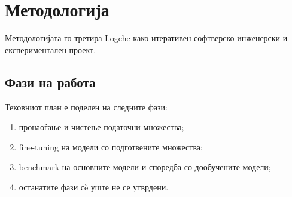 \chapter{Методологија}

Методологијата го третира Logche како итеративен софтверско-инженерски и експериментален проект.

\section{Фази на работа}

Тековниот план е поделен на следните фази:

\begin{enumerate}
  \item пронаоѓање и чистење податочни множества;
  \item fine-tuning на модели со подготвените множества;
  \item benchmark на основните модели и споредба со дообучените модели;
  \item останатите фази сè уште не се утврдени.
\end{enumerate}
